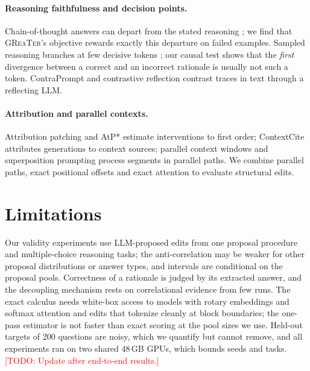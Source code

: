 \documentclass{article}
\newcommand{\greater}{\textsc{GReaTer}}
\newcommand{\todo}[1]{\textcolor{red}{[TODO: #1]}}
\begin{document}
\paragraph{Reasoning faithfulness and decision points.} Chain-of-thought answers can
depart from the stated reasoning \citep{turpin2023unfaithful,lanham2023faithfulness}; we
find that \greater{}'s objective rewards exactly this departure on failed examples.
Sampled reasoning branches at few decisive tokens
\citep{bigelow2025forking,jia2026forking,lin2024critical,abdin2024phi4,shen2026decision};
our causal test shows that the \emph{first} divergence between a correct and an incorrect
rationale is usually not such a token. ContraPrompt \citep{rishav2026contraprompt} and
contrastive reflection \citep{koh2026contrastive} contrast traces in text through a
reflecting LLM.

\paragraph{Attribution and parallel contexts.} Attribution patching and AtP*
\citep{syed2024atp,kramar2024atp} estimate interventions to first order; ContextCite
\citep{cohenwang2024contextcite} attributes generations to context sources; parallel
context windows \citep{ratner2023pcw} and superposition prompting
\citep{merth2024superposition} process segments in parallel paths. We combine parallel
paths, exact positional offsets and exact attention to evaluate structural edits.

\section{Limitations}
Our validity experiments use LLM-proposed edits from one proposal procedure and
multiple-choice reasoning tasks; the anti-correlation may be weaker for other proposal
distributions or answer types, and intervals are conditional on the proposal pools.
Correctness of a rationale is judged by its extracted answer, and the decoupling
mechanism rests on correlational evidence from few runs. The exact calculus needs
white-box access to models with rotary embeddings and softmax attention and edits that
tokenize cleanly at block boundaries; the one-pass estimator is not faster than exact
scoring at the pool sizes we use. Held-out targets of 200 questions are noisy, which we
quantify but cannot remove, and all experiments ran on two shared 48\,GB GPUs, which
bounds seeds and tasks. \todo{Update after end-to-end results.}
\end{document}
